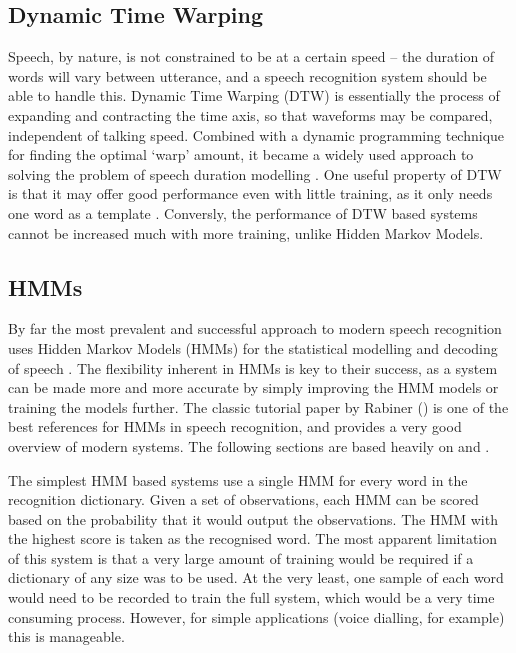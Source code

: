 	\subsection{Dynamic Time Warping} %
		\label{sub:dynamic_time_warping}
		Speech, by nature, is not constrained to be at a certain speed -- the duration of words will vary between utterance, and a speech recognition system should be able to handle this.  Dynamic Time Warping (DTW) is essentially the process of expanding and contracting the time axis, so that waveforms may be compared, independent of talking speed.  Combined with a dynamic programming technique for finding the optimal `warp' amount, it became a widely used approach to solving the problem of speech duration modelling \cite{furui1989speech}.  One useful property of DTW is that it may offer good performance even with little training, as it only needs one word as a template \cite{melnikoff2003speech}.  Conversly, the performance of DTW based systems cannot be increased much with more training, unlike Hidden Markov Models.

	\subsection{HMMs} %
	\label{sub:about_hmms}
		By far the most prevalent and successful approach to modern speech recognition uses Hidden Markov Models (HMMs) for the statistical modelling and decoding of speech \cite{cox1988hidden}.  The flexibility inherent in HMMs is key to their success, as a system can be made more and more accurate by simply improving the HMM models or training the models further.  The classic tutorial paper by Rabiner (\cite{rabiner1989tutorial}) is one of the best references for HMMs in speech recognition, and provides a very good overview of modern systems.  The following sections are based heavily on \cite{rabiner1989tutorial} and \cite{htkbook}.

		The simplest HMM based systems use a single HMM for every word in the recognition dictionary.  Given a set of observations, each HMM can be scored based on the probability that it would output the observations.  The HMM with the highest score is taken as the recognised word.  The most apparent limitation of this system is that a very large amount of training would be required if a dictionary of any size was to be used.  At the very least, one sample of each word would need to be recorded to train the full system, which would be a very time consuming process.  However, for simple applications (voice dialling, for example) this is manageable.

